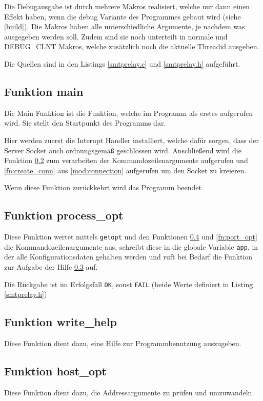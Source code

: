 \documentclass[pdftex,final,a4paper,10pt,notitlepage,halfparskip]{scrreprt}
\begin{document}
Die Debugausgabe ist durch mehrere Makros realisiert, welche nur dann einen Effekt haben, wenn die debug Variante des Programmes gebaut wird (siehe \ref{build}). Die Makros haben alle unterschiedliche Argumente, je nachdem was ausgegeben werden soll. Zudem sind sie noch unterteilt in normale und DEBUG\_CLNT Makros, welche zusätzlich noch die aktuelle Threadid ausgeben.

Die Quellen sind in den Listings \ref{smtprelay.c} und \ref{smtprelay.h} aufgeführt.

\subsection{Funktion main}\label{fn:main}
Die Main Funktion ist die Funktion, welche im Programm als erstes aufgerufen wird. Sie stellt den Startpunkt des Programms dar.

Hier werden zuerst die Interupt Handler installiert, welche dafür sorgen, dass der Server Socket auch ordnungsgemäß geschlossen wird. Anschließend wird die Funktion \ref{fn:process_opt} zum verarbeiten der Kommandozeilenargumente aufgerufen und \ref{fn:create_conn} aus \ref{mod:connection} aufgerufen um den Socket zu kreieren.

Wenn diese Funktion zurückkehrt wird das Programm beendet.

\subsection{Funktion process\_opt}\label{fn:process_opt}
Diese Funktion wertet mittels \texttt{getopt} und den Funktionen \ref{fn:host_opt} und \ref{fn:port_opt} die Kommandozeilenargumente aus, schreibt diese in die globale Variable \texttt{app}, in der alle Konfigurationsdaten gehalten werden und ruft bei Bedarf die Funktion zur Aufgabe der Hilfe \ref{fn:write_help} auf.

Die Rückgabe ist im Erfolgsfall \texttt{OK}, sonst \texttt{FAIL} (beide Werte definiert in Listing \ref{smtprelay.h})

\subsection{Funktion write\_help}\label{fn:write_help}
Diese Funktion dient dazu, eine Hilfe zur Programmbenutzung auszugeben.

\subsection{Funktion host\_opt}\label{fn:host_opt}
Diese Funktion dient dazu, die Addressargumente zu prüfen und umzuwandeln.
\end{document}
